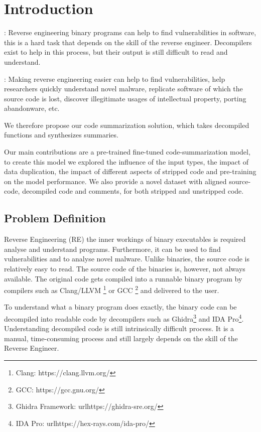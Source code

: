 \chapter{Introduction}
\label{introduction}

\begin{description}
\item[Problem definition]: Reverse engineering binary programs can help to find vulnerabilities in software, this is a hard task that depends on the skill of the reverse engineer. Decompilers exist to help in this process, but their output is still difficult to read and understand.

\item[Significance]: Making reverse engineering easier can help to find vulnerabilities, help researchers quickly understand novel malware, replicate software of which the source code is lost, discover illegitimate usages of intellectual property, porting abandonware, etc.

\item We therefore propose our code summarization solution, which takes decompiled functions and synthesizes summaries.

\item Our main contributions are a pre-trained fine-tuned code-summarization model, to create this model we explored the influence of the input types, the impact of data duplication, the impact of different aspects of stripped code and pre-training on the model performance. We also provide a novel dataset with aligned source-code, decompiled code and comments, for both stripped and unstripped code.
\end{description}
\newpage

\section{Problem Definition}
Reverse Engineering (RE) the inner workings of binary executables is required analyse and understand programs. Furthermore, it can be used to find vulnerabilities and to analyse novel malware. Unlike binaries, the source code is relatively easy to read. The source code of the binaries is, however, not always available. The original code gets compiled into a runnable binary program by compilers such as Clang/LLVM \footnote{Clang: https://clang.llvm.org/} or GCC \footnote{GCC: https://gcc.gnu.org/} and delivered to the user.

To understand what a binary program does exactly, the binary code can be decompiled into readable code by decompilers such as Ghidra\footnote{Ghidra Framework: url{https://ghidra-sre.org/}} and IDA Pro\footnote{IDA Pro: url{https://hex-rays.com/ida-pro/}}. Understanding decompiled code is still intrinsically difficult process. It is a manual, time-consuming process and still largely depends on the skill of the Reverse Engineer\cite{TypeInferenceSurvey}.

